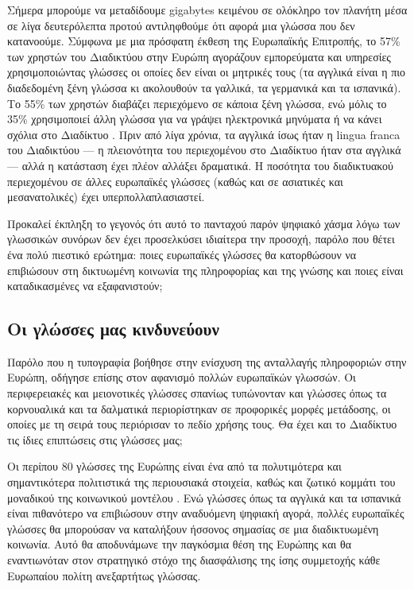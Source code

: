 \begin{multicols}{2}

Σήμερα μπορούμε να μεταδίδουμε gigabytes κειμένου σε ολόκληρο τον πλανήτη μέσα σε λίγα δευτερόλεπτα προτού αντιληφθούμε ότι αφορά μια γλώσσα που δεν κατανοούμε. Σύμφωνα με μια πρόσφατη έκθεση της Ευρωπαϊκής Επιτροπής, το 57\% των χρηστών του Διαδικτύου στην Ευρώπη αγοράζουν εμπορεύματα και υπηρεσίες χρησιμοποιώντας γλώσσες οι οποίες δεν είναι οι μητρικές τους (τα αγγλικά είναι η πιο διαδεδομένη ξένη γλώσσα κι ακολουθούν τα γαλλικά, τα γερμανικά και τα ισπανικά). Το 55\% των χρηστών διαβάζει περιεχόμενο σε κάποια ξένη γλώσσα, ενώ μόλις το 35\% χρησιμοποιεί άλλη γλώσσα για να γράψει ηλεκτρονικά μηνύματα ή να κάνει σχόλια στο Διαδίκτυο \cite{EC1}. Πριν από λίγα χρόνια, τα αγγλικά ίσως ήταν η lingua franca του Διαδικτύου — η πλειονότητα του περιεχομένου στο Διαδίκτυο ήταν στα αγγλικά — αλλά η κατάσταση έχει πλέον αλλάξει δραματικά. Η ποσότητα του διαδικτυακού περιεχομένου σε άλλες ευρωπαϊκές  γλώσσες (καθώς και σε ασιατικές και μεσανατολικές) έχει υπερπολλαπλασιαστεί. 

Προκαλεί έκπληξη το γεγονός ότι αυτό το πανταχού παρόν ψηφιακό χάσμα λόγω των γλωσσικών συνόρων δεν έχει προσελκύσει ιδιαίτερα την προσοχή,  παρόλο που θέτει ένα πολύ πιεστικό ερώτημα: ποιες ευρωπαϊκές γλώσσες θα κατορθώσουν να επιβιώσουν στη δικτυωμένη κοινωνία της πληροφορίας και της γνώσης και ποιες είναι καταδικασμένες να εξαφανιστούν;

\subsection{Οι γλώσσες μας κινδυνεύουν}

Παρόλο που η τυπογραφία βοήθησε στην ενίσχυση της ανταλλαγής πληροφοριών στην Ευρώπη, οδήγησε επίσης στον αφανισμό πολλών ευρωπαϊκών γλωσσών. Οι περιφερειακές και μειονοτικές γλώσσες σπανίως τυπώνονταν και γλώσσες όπως τα κορνουαλικά και τα δαλματικά περιορίστηκαν σε προφορικές μορφές μετάδοσης, οι οποίες με τη σειρά τους περιόρισαν το πεδίο χρήσης τους. Θα έχει και το Διαδίκτυο τις ίδιες επιπτώσεις στις γλώσσες μας;

Οι περίπου 80 γλώσσες της Ευρώπης είναι ένα από τα πολυτιμότερα και σημαντικότερα πολιτιστικά της περιουσιακά στοιχεία, καθώς και ζωτικό κομμάτι του μοναδικού της κοινωνικού μοντέλου \cite{EC2}. Ενώ γλώσσες όπως τα αγγλικά και τα ισπανικά είναι πιθανότερο να επιβιώσουν στην αναδυόμενη ψηφιακή αγορά, πολλές ευρωπαϊκές γλώσσες θα μπορούσαν να καταλήξουν ήσσονος σημασίας σε μια διαδικτυωμένη κοινωνία. Αυτό θα αποδυνάμωνε την παγκόσμια θέση της Ευρώπης και θα εναντιωνόταν  στον στρατηγικό στόχο της διασφάλισης της ίσης συμμετοχής κάθε Ευρωπαίου πολίτη ανεξαρτήτως γλώσσας.


\end{multicols}

